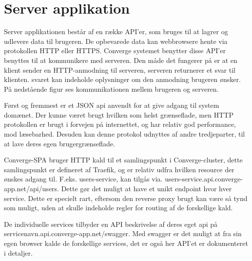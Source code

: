 \section{Server applikation}

Server applikationen består af en række API’er, som bruges til at lagrer og udlevere data til brugeren. De opbevarede data kan webbrowsere hente via protokollen HTTP eller HTTPS. 
Converge systemet benytter disse API’er benyttes til at kommunikere med serveren. Den måde det fungerer på er at en klient sender en HTTP-anmodning til serveren, serveren returnerer et svar til klienten. svaret kan indeholde oplysninger om den anmodning brugeren ønsker. På nedstående figur ses kommunikationen mellem brugeren og serveren.


Først og fremmest er et JSON api anvendt for at give adgang til system domænet. Der kunne været brugt hvilken som helst grænseflade, men HTTP protokollen er brugt i forvejen på internettet, og har relativ god performance, mod læsebarhed. Desuden kan denne protokol udnyttes af andre tredjeparter, til at lave deres egen brugergrænseflade. 

Converge-SPA bruger HTTP kald til et samlingspunkt i Converge-cluster, dette samlingspunkt er defineret af Traefik, og er relativ udfra hvilken resource der ønskes adgang til. F.eks. users-service, kan tilgås via. users-service.api.converge-app.net/api/users. Dette gør det muligt at have et unikt endpoint hvor hver service. Dette er specielt rart, eftersom den reverse proxy brugt kan være så tynd som muligt, uden at skulle indeholde regler for routing af de forskellige kald.

De individuelle services tilbyder en API beskrivelse af deres eget api på servicenavn.api.converge-app.net/swagger. Med swagger er det muligt at fra sin egen browser kalde de forskellige services, det er også her API'et er dokumenteret i detaljer.